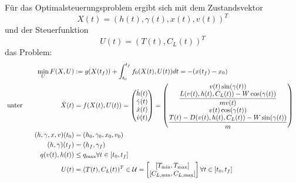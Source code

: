 \begin{problem}\label{prob:MaxRF}
    Für das Optimalsteuerungsproblem ergibt sich mit dem Zustandsvektor
    \[X(t) = (h(t),\gamma(t),x(t),v(t))^T\]
    und der Steuerfunktion
    \[U(t) = (T(t),C_L(t))^T\]
    das Problem:
    \begin{align*}
        \min_{U} F(X,U) &:= g(X(t_f)) + \int_{t_0}^{t_f} f_0(X(t),U(t)) dt = -(x(t_f) - x_0) & & \\\
        \text{unter} \hspace{20mm} \dot{X}(t) &= f(X(t),U(t)) =     
         \begin{pmatrix}
         \dot{h}(t)  \\ 
         \dot{\gamma}(t)  \\ 
         \dot{x}(t)  \\ 
         \dot{v}(t)   \\ 
	 \end{pmatrix} 
        = 
        \begin{pmatrix}
            v(t) \sin(\gamma(t)) \\ 
            \dfrac{L(v(t),h(t),C_L(t)) - W \cos(\gamma(t))}{mv(t)} \\ 
            v(t) \cos(\gamma(t)) \\ 
            \dfrac{T(t) - D(v(t),h(t),C_L(t)) - W \sin(\gamma(t))}{m}
        \end{pmatrix}  \\\
        (h,\gamma,x,v)(t_0) &= (h_0,\gamma_0,x_0,v_0)  \\\
        (h,\gamma)(t_f) &= (h_f,\gamma_f)  \\\
        q(v(t),h(t)) &\leq q_{\max}   \forall t \in [t_0,t_f]\\\
        U(t) &= (T(t),C_L(t))^T \in \mathcal{U} = \left[ 
        \begin{matrix}
            [T_{\min},T_{\max}] \\ 
            [C_{L, \min},C_{L, \max}]
        \end{matrix} 
        \right]  \forall t \in [t_0,t_f]
    \end{align*}
\end{problem}

